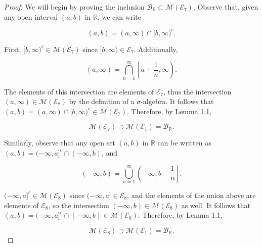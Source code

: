 \documentclass[11pt,oneside,english]{amsart}
\theoremstyle{definition}
\newcommand{\R}{\mathbb{R}}
\newcommand{\MC}[1]{\mathcal{#1}}
\begin{document}
\begin{enumerate}
\begin{enumerate}
\begin{proof}
We will begin by proving the inclusion $\MC{B}_{\R}\subset\MC{M}(\MC{E}_7)$. Observe that, given any open interval $(a,b)$ in $\R$, we can write 

\[
(a,b)=(a,\infty)\cap[b,\infty)^c.
\]

First, $[b,\infty)^c\in\MC{M}(\MC{E}_7)$ since $[b,\infty)\in\MC{E}_7$. Additionally,

\[
(a,\infty)=\bigcap_{n=1}^\infty\left[a+\frac{1}{n},\infty\right).
\]

%
%
%
%

The elements of this intersection are elements of $\MC{E}_7$, thus the intersection $(a,\infty)\in\MC{M}(\MC{E}_7)$ by the definition of a $\sigma$-algebra. It follows that  $(a,b)=(a,\infty)\cap[b,\infty)^c\in\MC{M}(\MC{E}_7)$. Therefore, by Lemma 1.1,

\[
\MC{M}(\MC{E}_7)\supset\MC{M}(\MC{E}_1)=\MC{B}_\R.
\]

Similarly, observe that any open set $(a,b)$ in $\R$ can be written as $(a,b)=(-\infty,a]^c\cap(-\infty,b)$, and 

\[
(-\infty,b)=\bigcup_{n=1}^\infty\left(-\infty,b-\frac{1}{n}\right].
\]

$(-\infty,a]^c\in\MC{M}(\MC{E}_8)$ since $(-\infty,a]\in\MC{E}_8$, and the elements of the union above are elements of $\MC{E}_8$, so the intersection $(-\infty,b)\in\MC{M}(\MC{E}_8)$ as well. It follows that $(a,b)=(-\infty,a]^c\cap(-\infty,b)\in\MC{M}(\MC{E}_8)$. Therefore, by Lemma 1.1,

\[
\MC{M}(\MC{E}_8)\supset\MC{M}(\MC{E}_1)=\MC{B}_\R.
\]


\end{proof}


\end{enumerate}
\end{enumerate}
\end{document}
